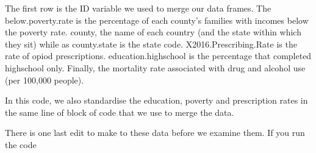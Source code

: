 \documentclass[
]{article}
\newenvironment{Shaded}{\begin{snugshade}}{\end{snugshade}}
\newcommand{\FunctionTok}[1]{\textcolor[rgb]{0.13,0.29,0.53}{\textbf{#1}}}
\newcommand{\NormalTok}[1]{#1}
\newcommand{\SpecialCharTok}[1]{\textcolor[rgb]{0.81,0.36,0.00}{\textbf{#1}}}
\begin{document}
The first row is the ID variable we used to merge our data frames. The
below.poverty.rate is the percentage of each county's families with
incomes below the poverty rate. county, the name of each country (and
the state within which they sit) while as county.state is the state
code. X2016.Prescribing.Rate is the rate of opiod prescriptions.
education.highschool is the percentage that completed highschool only.
Finally, the mortality rate associated with drug and alcohol use (per
100,000 people).

In this code, we also standardise the education, poverty and
prescription rates in the same line of block of code that we use to
merge the data.

There is one last edit to make to these data before we examine them. If
you run the code

\begin{Shaded}
\end{Shaded}
\end{document}
